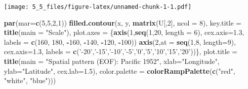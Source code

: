 \documentclass[]{article}
\newenvironment{Shaded}{\begin{snugshade}}{\end{snugshade}}
\newcommand{\KeywordTok}[1]{\textcolor[rgb]{0.13,0.29,0.53}{\textbf{#1}}}
\newcommand{\DataTypeTok}[1]{\textcolor[rgb]{0.13,0.29,0.53}{#1}}
\newcommand{\DecValTok}[1]{\textcolor[rgb]{0.00,0.00,0.81}{#1}}
\newcommand{\FloatTok}[1]{\textcolor[rgb]{0.00,0.00,0.81}{#1}}
\newcommand{\StringTok}[1]{\textcolor[rgb]{0.31,0.60,0.02}{#1}}
\newcommand{\OperatorTok}[1]{\textcolor[rgb]{0.81,0.36,0.00}{\textbf{#1}}}
\newcommand{\NormalTok}[1]{#1}
\begin{document}
\texttt{[image: 5\_5\_files/figure-latex/unnamed-chunk-1-1.pdf]}

\begin{Shaded}
\begin{Highlighting}[]
\KeywordTok{par}\NormalTok{(}\DataTypeTok{mar=}\KeywordTok{c}\NormalTok{(}\DecValTok{5}\NormalTok{,}\DecValTok{5}\NormalTok{,}\DecValTok{2}\NormalTok{,}\DecValTok{1}\NormalTok{))}
\KeywordTok{filled.contour}\NormalTok{(x, y, }\KeywordTok{matrix}\NormalTok{(U[,}\DecValTok{2}\NormalTok{], }\DataTypeTok{ncol =} \DecValTok{8}\NormalTok{), }
               \DataTypeTok{key.title =} \KeywordTok{title}\NormalTok{(}\DataTypeTok{main =} \StringTok{"Scale"}\NormalTok{),}
               \DataTypeTok{plot.axes =}\NormalTok{  \{}\KeywordTok{axis}\NormalTok{(}\DecValTok{1}\NormalTok{,}\KeywordTok{seq}\NormalTok{(}\DecValTok{1}\NormalTok{,}\DecValTok{20}\NormalTok{, }\DataTypeTok{length =} \DecValTok{6}\NormalTok{), }\DataTypeTok{cex.axis=}\FloatTok{1.3}\NormalTok{, }\DataTypeTok{labels =} \KeywordTok{c}\NormalTok{(}\DecValTok{160}\NormalTok{, }\DecValTok{180}\NormalTok{, }\OperatorTok{-}\DecValTok{160}\NormalTok{, }\OperatorTok{-}\DecValTok{140}\NormalTok{, }\OperatorTok{-}\DecValTok{120}\NormalTok{, }\OperatorTok{-}\DecValTok{100}\NormalTok{))  }
                 \KeywordTok{axis}\NormalTok{(}\DecValTok{2}\NormalTok{,}\DataTypeTok{at =} \KeywordTok{seq}\NormalTok{(}\DecValTok{1}\NormalTok{,}\DecValTok{8}\NormalTok{, }\DataTypeTok{length=}\DecValTok{9}\NormalTok{), }\DataTypeTok{cex.axis=}\FloatTok{1.3}\NormalTok{, }\DataTypeTok{labels =} \KeywordTok{c}\NormalTok{(}\StringTok{'-20'}\NormalTok{,}\StringTok{'-15'}\NormalTok{,}\StringTok{'-10'}\NormalTok{,}\StringTok{'-5'}\NormalTok{,}\StringTok{'0'}\NormalTok{,}\StringTok{'5'}\NormalTok{,}\StringTok{'10'}\NormalTok{,}\StringTok{'15'}\NormalTok{,}\StringTok{'20'}\NormalTok{))\},}
               \DataTypeTok{plot.title =} \KeywordTok{title}\NormalTok{(}\DataTypeTok{main =} \StringTok{"Spatial pattern (EOF): Pacific 1952"}\NormalTok{,}
                                  \DataTypeTok{xlab=}\StringTok{"Longitude"}\NormalTok{,}
                                  \DataTypeTok{ylab=}\StringTok{"Latitude"}\NormalTok{, }\DataTypeTok{cex.lab=}\FloatTok{1.5}\NormalTok{),}
               \DataTypeTok{color.palette =} \KeywordTok{colorRampPalette}\NormalTok{(}\KeywordTok{c}\NormalTok{(}\StringTok{"red"}\NormalTok{, }\StringTok{"white"}\NormalTok{, }\StringTok{"blue"}\NormalTok{)))}
\end{Highlighting}
\end{Shaded}
\end{document}
